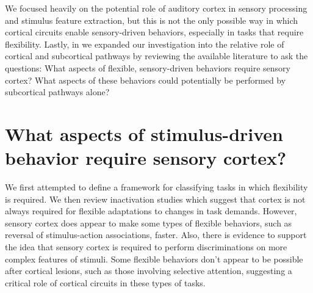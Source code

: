 We focused heavily on the potential role of auditory cortex in sensory processing and stimulus feature extraction, but this is not the only possible way in which cortical circuits enable sensory-driven behaviors, especially in tasks that require flexibility. 
%
Lastly, in \ch{\Rev} we expanded our investigation into the relative role of cortical and subcortical pathways by reviewing the available literature to ask the questions: What aspects of flexible, sensory-driven behaviors require sensory cortex? 
%
What aspects of these behaviors could potentially be performed by subcortical pathways alone?

\section{What aspects of stimulus-driven behavior require sensory cortex?}

We first attempted to define a framework for classifying tasks in which flexibility is required. 
%
We then review inactivation studies which suggest that cortex is not always required for flexible adaptations to changes in task demands. 
%
However, sensory cortex does appear to make some types of flexible behaviors, such as reversal of stimulus-action associations, faster. 
%
Also, there is evidence to support the idea that sensory cortex is required to perform discriminations on more complex features of stimuli. 
%
Some flexible behaviors don't appear to be possible after cortical lesions, such as those involving selective attention, suggesting a critical role of cortical circuits in these types of tasks. 


